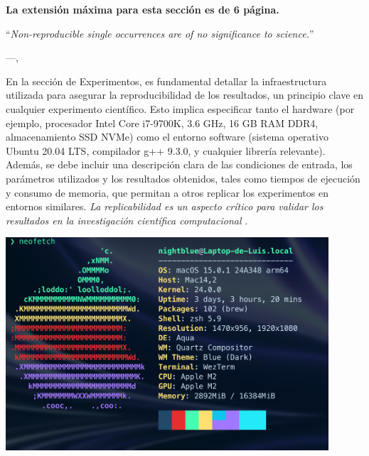 \begin{mdframed}
    \textbf{La extensión máxima para esta sección es de 6 página.}
\end{mdframed}


\epigraph{``\textit{Non-reproducible single occurrences are of no significance to
science.}''}{---\citeauthor{popper2005logic},\citeyear{popper2005logic} \cite{popper2005logic}}
En la sección de Experimentos, es fundamental detallar la infraestructura utilizada para asegurar la reproducibilidad de los resultados, un principio clave en cualquier experimento científico. Esto implica especificar tanto el hardware (por ejemplo, procesador Intel Core i7-9700K, 3.6 GHz, 16 GB RAM DDR4, almacenamiento SSD NVMe) como el entorno software (sistema operativo Ubuntu 20.04 LTS, compilador g++ 9.3.0, y cualquier librería relevante). Además, se debe incluir una descripción clara de las condiciones de entrada, los parámetros utilizados y los resultados obtenidos, tales como tiempos de ejecución y consumo de memoria, que permitan a otros replicar los experimentos en entornos similares. \textit{La replicabilidad es un aspecto crítico para validar los resultados en la investigación científica computacional} \cite{inbookFonseca}.


\includegraphics[width=0.9\textwidth]{images/neofetch.png}